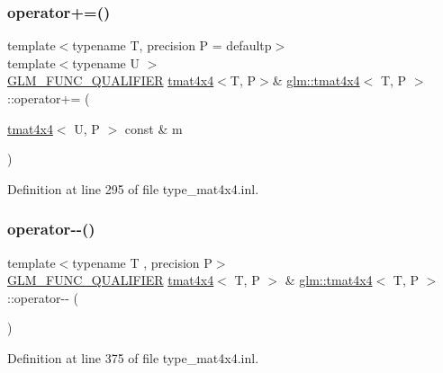 \subsubsection{\texorpdfstring{operator+=()}{operator+=()}\hspace{0.1cm}{\footnotesize\ttfamily [4/4]}}
{\footnotesize\ttfamily template$<$typename T, precision P = defaultp$>$ \\
template$<$typename U $>$ \\
\mbox{\hyperlink{setup_8hpp_a33fdea6f91c5f834105f7415e2a64407}{G\+L\+M\+\_\+\+F\+U\+N\+C\+\_\+\+Q\+U\+A\+L\+I\+F\+I\+ER}} \mbox{\hyperlink{structglm_1_1tmat4x4}{tmat4x4}}$<$T, P$>$\& \mbox{\hyperlink{structglm_1_1tmat4x4}{glm\+::tmat4x4}}$<$ T, P $>$\+::operator+= (\begin{DoxyParamCaption}\item[{\mbox{\hyperlink{structglm_1_1tmat4x4}{tmat4x4}}$<$ U, P $>$ const \&}]{m }\end{DoxyParamCaption})}



Definition at line 295 of file type\+\_\+mat4x4.\+inl.

\mbox{\label{structglm_1_1tmat4x4_a609557d02e1794629bca91f52f74626a}} 
\subsubsection{\texorpdfstring{operator-\/-\/()}{operator--()}\hspace{0.1cm}{\footnotesize\ttfamily [1/2]}}
{\footnotesize\ttfamily template$<$typename T , precision P$>$ \\
\mbox{\hyperlink{setup_8hpp_a33fdea6f91c5f834105f7415e2a64407}{G\+L\+M\+\_\+\+F\+U\+N\+C\+\_\+\+Q\+U\+A\+L\+I\+F\+I\+ER}} \mbox{\hyperlink{structglm_1_1tmat4x4}{tmat4x4}}$<$ T, P $>$ \& \mbox{\hyperlink{structglm_1_1tmat4x4}{glm\+::tmat4x4}}$<$ T, P $>$\+::operator-\/-\/ (\begin{DoxyParamCaption}{ }\end{DoxyParamCaption})}



Definition at line 375 of file type\+\_\+mat4x4.\+inl.

\mbox{\label{structglm_1_1tmat4x4_ab1c8914e89847162b577d27d79a2b352}} 
